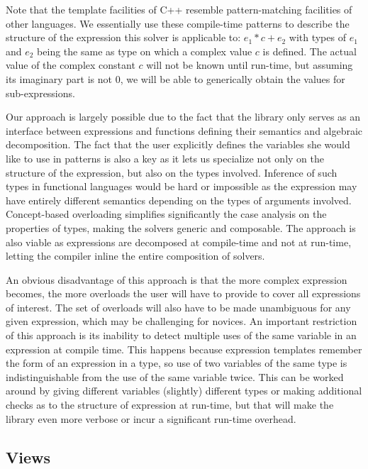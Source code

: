 \noindent
Note that the template facilities of C++ resemble pattern-matching facilities of 
other languages. We essentially use these compile-time patterns to describe the 
structure of the expression this solver is applicable to: $e_1*c+e_2$ with types 
of $e_1$ and $e_2$ being the same as type on which a complex value $c$ is 
defined. The actual value of the complex constant $c$ will not be known until 
run-time, but assuming its imaginary part is not $0$, we will be able to 
generically obtain the values for sub-expressions.

Our approach is largely possible due to the fact that the library only serves as 
an interface between expressions and functions defining their semantics and 
algebraic decomposition. The fact that the user explicitly defines the variables 
she would like to use in patterns is also a key as it lets us specialize not 
only on the structure of the expression, but also on the types involved. 
Inference of such types in functional languages would be hard or impossible as the 
expression may have entirely different semantics depending on the types of 
arguments involved. Concept-based overloading simplifies significantly the case 
analysis on the properties of types, making the solvers generic and composable.
The approach is also viable as expressions are decomposed at compile-time and 
not at run-time, letting the compiler inline the entire composition of solvers. 

An obvious disadvantage of this approach is that the more complex expression 
becomes, the more overloads the user will have to provide to cover all 
expressions of interest. The set of overloads will also have to be made 
unambiguous for any given expression, which may be challenging for novices. An 
important restriction of this approach is its inability to detect multiple uses 
of the same variable in an expression at compile time. This happens because 
expression templates remember the form of an expression in a type, so use of two 
variables of the same type is indistinguishable from the use of the same 
variable twice. This can be worked around by giving different variables 
(slightly) different types or making additional checks as to the structure of 
expression at run-time, but that will make the library even more verbose or 
incur a significant run-time overhead.

\subsection{Views}
\label{sec:view}

